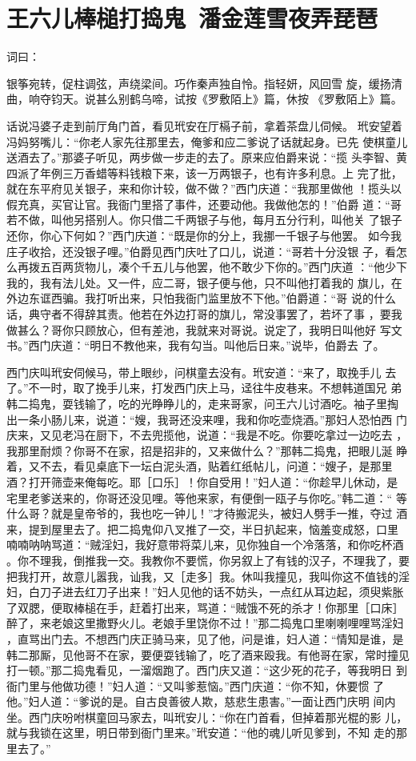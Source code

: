 \chapter{王六儿棒槌打捣鬼~潘金莲雪夜弄琵琶}

词曰：

银筝宛转，促柱调弦，声绕梁间。巧作秦声独自怜。指轻妍，风回雪
旋，缓扬清曲，响夺钧天。说甚么别鹤乌啼，试按《罗敷陌上》篇，休按
《罗敷陌上》篇。

话说冯婆子走到前厅角门首，看见玳安在厅槅子前，拿着茶盘儿伺候。
玳安望着冯妈努嘴儿：“你老人家先往那里去，俺爹和应二爹说了话就起身。已先
使棋童儿送酒去了。”那婆子听见，两步做一步走的去了。原来应伯爵来说：“揽
头李智、黄四派了年例三万香蜡等料钱粮下来，该一万两银子，也有许多利息。上
完了批，就在东平府见关银子，来和你计较，做不做？”西门庆道：“我那里做他
！揽头以假充真，买官让官。我衙门里搭了事件，还要动他。我做他怎的！”伯爵
道：“哥若不做，叫他另搭别人。你只借二千两银子与他，每月五分行利，叫他关
了银子还你，你心下何如？”西门庆道：“既是你的分上，我挪一千银子与他罢。
如今我庄子收拾，还没银子哩。”伯爵见西门庆吐了口儿，说道：“哥若十分没银
子，看怎么再拨五百两货物儿，凑个千五儿与他罢，他不敢少下你的。”西门庆道
：“他少下我的，我有法儿处。又一件，应二哥，银子便与他，只不叫他打着我的
旗儿，在外边东诓西骗。我打听出来，只怕我衙门监里放不下他。”伯爵道：“哥
说的什么话，典守者不得辞其责。他若在外边打哥的旗儿，常没事罢了，若坏了事
，要我做甚么？哥你只顾放心，但有差池，我就来对哥说。说定了，我明日叫他好
写文书。”西门庆道：“明日不教他来，我有勾当。叫他后日来。”说毕，伯爵去
了。

西门庆叫玳安伺候马，带上眼纱，问棋童去没有。玳安道：“来了，取挽手儿
去了。”不一时，取了挽手儿来，打发西门庆上马，迳往牛皮巷来。不想韩道国兄
弟韩二捣鬼，耍钱输了，吃的光睁睁儿的，走来哥家，问王六儿讨酒吃。袖子里掏
出一条小肠儿来，说道：“嫂，我哥还没来哩，我和你吃壶烧酒。”那妇人恐怕西
门庆来，又见老冯在厨下，不去兜揽他，说道：“我是不吃。你要吃拿过一边吃去
，我那里耐烦？你哥不在家，招是招非的，又来做什么？”那韩二捣鬼，把眼儿涎
睁着，又不去，看见桌底下一坛白泥头酒，贴着红纸帖儿，问道：“嫂子，是那里
酒？打开筛壶来俺每吃。耶［口乐］！你自受用！”妇人道：“你趁早儿休动，是
宅里老爹送来的，你哥还没见哩。等他来家，有便倒一瓯子与你吃。”韩二道：“
等什么哥？就是皇帝爷的，我也吃一钟儿！”才待搬泥头，被妇人劈手一推，夺过
酒来，提到屋里去了。把二捣鬼仰八叉推了一交，半日扒起来，恼羞变成怒，口里
喃喃呐呐骂道：“贼淫妇，我好意带将菜儿来，见你独自一个冷落落，和你吃杯酒
。你不理我，倒推我一交。我教你不要慌，你另叙上了有钱的汉子，不理我了，要
把我打开，故意儿嚣我，讪我，又［走多］我。休叫我撞见，我叫你这不值钱的淫
妇，白刀子进去红刀子出来！”妇人见他的话不妨头，一点红从耳边起，须臾紫胀
了双腮，便取棒槌在手，赶着打出来，骂道：“贼饿不死的杀才！你那里［口床］
醉了，来老娘这里撒野火儿。老娘手里饶你不过！”那二捣鬼口里喇喇哩哩骂淫妇
，直骂出门去。不想西门庆正骑马来，见了他，问是谁，妇人道：“情知是谁，是
韩二那厮，见他哥不在家，要便耍钱输了，吃了酒来殴我。有他哥在家，常时撞见
打一顿。”那二捣鬼看见，一溜烟跑了。西门庆又道：“这少死的花子，等我明日
到衙门里与他做功德！”妇人道：“又叫爹惹恼。”西门庆道：“你不知，休要惯
了他。”妇人道：“爹说的是。自古良善彼人欺，慈悲生患害。”一面让西门庆明
间内坐。西门庆吩咐棋童回马家去，叫玳安儿：“你在门首看，但掉着那光棍的影
儿，就与我锁在这里，明日带到衙门里来。”玳安道：“他的魂儿听见爹到，不知
走的那里去了。”

